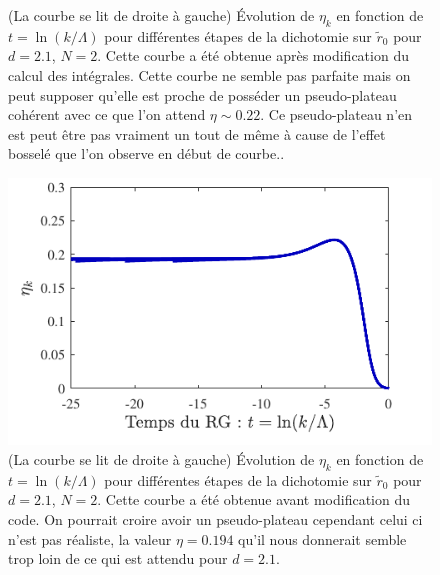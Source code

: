 \documentclass[10.5pt]{article}
\begin{document}
\begin{multicols*}{2}
\begin{figure}[H]
\begin{center}
		\caption{(La courbe se lit de droite à gauche) Évolution de $\eta_k$ en fonction de $t= \ln(k/\Lambda)$ pour différentes étapes de la dichotomie sur $\tilde{r}_0$ pour $d=2.1$, $N=2$. Cette courbe a été obtenue après modification du calcul des intégrales. Cette courbe ne semble pas parfaite mais on peut supposer qu'elle est proche de posséder un pseudo-plateau cohérent avec ce que l'on attend $\eta \sim 0.22$. Ce pseudo-plateau n'en est peut être pas vraiment un tout de même à cause de l'effet bosselé que l'on observe en début de courbe..}
		\label{fig:etakd21}
	\end{center}
\end{figure}
\begin{figure}[H]
	\begin{center}
		\includegraphics[width=0.95\columnwidth]{etakd21Bis.pdf}
		\caption{(La courbe se lit de droite à gauche) Évolution de $\eta_k$ en fonction de $t= \ln(k/\Lambda)$ pour différentes étapes de la dichotomie sur $\tilde{r}_0$ pour $d=2.1$, $N=2$. Cette courbe a été obtenue avant modification du code. On pourrait croire avoir un pseudo-plateau cependant celui ci n'est pas réaliste, la valeur $\eta = 0.194$ qu'il nous donnerait semble trop loin de ce qui est attendu pour $d=2.1$.}
		\label{fig:etakd21Bis}
	\end{center}
\end{figure}
\end{multicols*}
\end{document}
